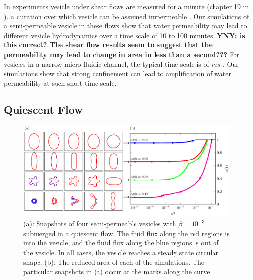 \documentclass[9pt,twocolumn,twoside,lineno]{pnas-new}
\newif\ifTikz
\begin{document}
In experiments vesicle under shear flows are measured for a minute (chapter 19 in \cite{Dimova2020_GVB}), a duration over which vesicle can be assumed impermeable \cite{AbkarianViallat2005_BJ}. Our simulations of a semi-permeable vesicle
in these flows show that water permeability may lead to different vesicle hydrodynamics over a time scale of 10 to 100 minutes. {\bf YNY: is this correct? The shear flow results seem to suggest that the permeability may lead to change in area in less than a second???}
For vesicles in a narrow micro-fluidic channel, the typical time scale is of $ms$ \cite{abk-fai-sto2006}. Our simulations show that strong confinement can lead to amplification of water permeability at such short time scale.
%

\subsection*{Quiescent Flow} 
\begin{figure}[htp]
  \centering
  \ifTikz
  
  \else
  \includegraphics{figures/relaxationComposite.pdf}
  \fi
  \caption{\label{fig:relaxationComposite} (a): Snapshots of four
  semi-permeable vesicles with $\beta = 10^{-3}$ submerged in a
  quiescent flow. The fluid flux along the red regions is into the
  vesicle, and the fluid flux along the blue regions is out of the
  vesicle. In all cases, the vesicle reaches a steady state circular
  shape. (b): The reduced area of each of the simulations. The
  particular snapshots in (a) occur at the marks along the curve.}
\end{figure}
\end{document}
